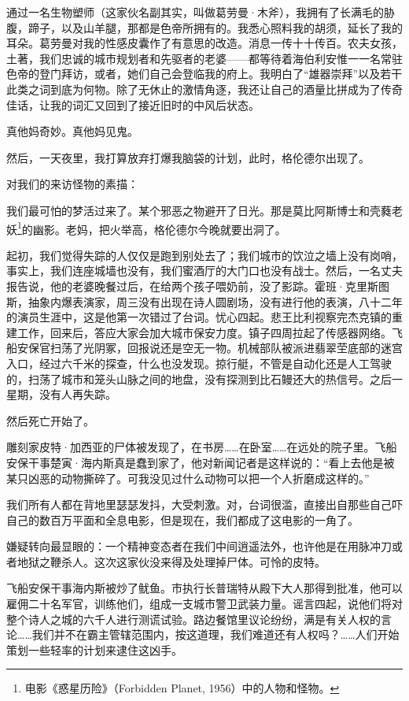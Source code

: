 \documentclass[AutoFakeBold=true]{book}
\begin{document}
通过一名生物塑师（这家伙名副其实，叫做葛劳曼·木斧），我拥有了长满毛的胁腹，蹄子，以及山羊腿，那都是色帝所拥有的。我悉心照料我的胡须，延长了我的耳朵。葛劳曼对我的性感皮囊作了有意思的改造。消息一传十十传百。农夫女孩，土著，我们忠诚的城市规划者和先驱者的老婆——都等待着海伯利安惟一一名常驻色帝的登门拜访，或者，她们自己会登临我的府上。我明白了``雄器崇拜''以及若干此类之词到底为何物。除了无休止的激情角逐，我还让自己的酒量比拼成为了传奇佳话，让我的词汇又回到了接近旧时的中风后状态。

真他妈奇妙。真他妈见鬼。

然后，一天夜里，我打算放弃打爆我脑袋的计划，此时，格伦德尔出现了。

\vspace*{1em}

对我们的来访怪物的素描：

我们最可怕的梦活过来了。某个邪恶之物避开了日光。那是莫比阿斯博士和壳蕤老妖\footnote{电影《惑星历险》（Forbidden Planet, 1956）中的人物和怪物。}的幽影。老妈，把火举高，格伦德尔今晚就要出洞了。

起初，我们觉得失踪的人仅仅是跑到别处去了；我们城市的饮泣之墙上没有岗哨，事实上，我们连座城墙也没有，我们蜜酒厅的大门口也没有战士。然后，一名丈夫报告说，他的老婆晚餐过后，在给两个孩子喂奶前，没了影踪。霍班·克里斯图斯，抽象内爆表演家，周三没有出现在诗人圆剧场，没有进行他的表演，八十二年的演员生涯中，这是他第一次错过了台词。忧心四起。悲王比利视察完杰克镇的重建工作，回来后，答应大家会加大城市保安力度。镇子四周拉起了传感器网络。飞船安保官扫荡了光阴冢，回报说还是空无一物。机械部队被派进翡翠茔底部的迷宫入口，经过六千米的探查，什么也没发现。掠行艇，不管是自动化还是人工驾驶的，扫荡了城市和笼头山脉之间的地盘，没有探测到比石鳗还大的热信号。之后一星期，没有人再失踪。

然后死亡开始了。

雕刻家皮特·加西亚的尸体被发现了，在书房……在卧室……在远处的院子里。飞船安保干事楚寅·海内斯真是蠢到家了，他对新闻记者是这样说的：``看上去他是被某只凶恶的动物撕碎了。可我没见过什么动物可以把一个人折磨成这样的。''

我们所有人都在背地里瑟瑟发抖，大受刺激。对，台词很滥，直接出自那些自己吓自己的数百万平面和全息电影，但是现在，我们都成了这电影的一角了。

嫌疑转向最显眼的：一个精神变态者在我们中间逍遥法外，也许他是在用脉冲刀或者地狱之鞭杀人。这次这家伙没来得及处理掉尸体。可怜的皮特。

飞船安保干事海内斯被炒了鱿鱼。市执行长普瑞特从殿下大人那得到批准，他可以雇佣二十名军官，训练他们，组成一支城市警卫武装力量。谣言四起，说他们将对整个诗人之城的六千人进行测谎试验。路边餐馆里议论纷纷，满是有关人权的言论……我们并不在霸主管辖范围内，按这道理，我们难道还有人权吗？……人们开始策划一些轻率的计划来逮住这凶手。
\end{document}
